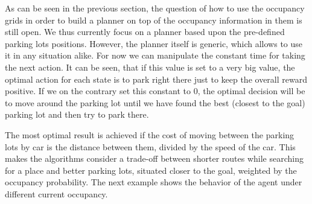 As can be seen in the previous section, the question of how to use the
occupancy grids in order to build a planner on top of the occupancy
information in them is still open. We thus currently focus on a planner based
upon the pre-defined parking lots positions. However, the planner itself is
generic, which allows to use it in any situation alike. For now we can
manipulate the constant time for taking the next action. It can be seen, that
if this value is set to a very big value, the optimal action for each state is
to park right there just to keep the overall reward positive. If we on the
contrary set this constant to 0, the optimal decision will be to move around
the parking lot until we have found the best (closest to the goal) parking lot
and then try to park there.

The most optimal result is achieved if the cost of moving between the parking
lots by car is the distance between them, divided by the speed of the car.
This makes the algorithms consider a trade-off between shorter routes while
searching for a place and better parking lots, situated closer to the goal,
weighted by the occupancy probability. The next example shows the behavior of
the agent under different current occupancy.


